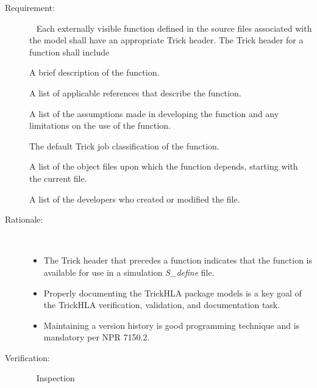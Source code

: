 \documentclass[twoside,11pt,titlepage]{report}
\begin{document}
\label{reqt:c_trick_header}
\begin{description}
  \item[Requirement:]\ \newline
    Each externally visible function defined in the source files
    associated with the model shall have an appropriate Trick header.
    The Trick header for a function shall include

    \label{reqt:c_trick_header_purpose}
      A brief description of the function.

    \label{reqt:c_trick_header_refs}
      A list of applicable references that describe the function.

    \label{reqt:c_trick_header_assum}
      A list of the assumptions made in developing the function and
      any limitations on the use of the function.

    \label{reqt:c_trick_header_class}
      The default Trick job classification of the function.

    \label{reqt:c_trick_header_depend}
      A list of the object files upon which the function depends,
      starting with the current file.

    \label{reqt:c_trick_header_prog}
      A list of the developers who created or modified the file.

  \item[Rationale:]\ \\[-20pt]
    \begin{itemize}
      \item The Trick header that precedes a function
        indicates that the function is available for
        use in a simulation {\em S\_define} file.
      \item Properly documenting the TrickHLA package models
        is a key goal of the TrickHLA verification,
        validation, and documentation task.
      \item Maintaining a version history is good programming
        technique and is mandatory per NPR 7150.2.
    \end{itemize}

  \item[Verification:]\ \newline
    Inspection
\end{description}
\end{document}

